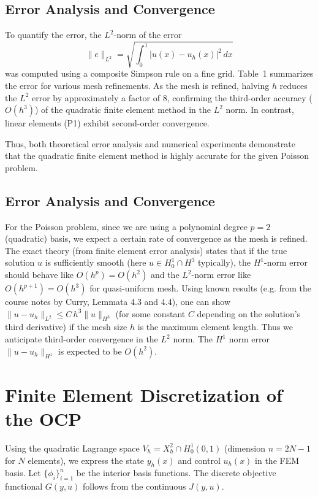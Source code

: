 \documentclass[a4paper,10pt]{article}
\begin{document}
\subsection{Error Analysis and Convergence}
To quantify the error, the \(L^2\)-norm of the error
\[
	\|e\|_{L^2} = \sqrt{\int_0^1 |u(x)-u_h(x)|^2\,dx}
\]
was computed using a composite Simpson rule on a fine grid. Table~1 summarizes the error for various mesh refinements. As the mesh is refined, halving \(h\) reduces the \(L^2\) error by approximately a factor of 8, confirming the third-order accuracy (\(O(h^3)\)) of the quadratic finite element method in the \(L^2\) norm. In contrast, linear elements (P1) exhibit second-order convergence.

Thus, both theoretical error analysis and numerical experiments demonstrate that the quadratic finite element method is highly accurate for the given Poisson problem.

\subsection{Error Analysis and Convergence}
For the Poisson problem, since we are using a polynomial degree \(p=2\) (quadratic) basis, we expect a certain rate of convergence as the mesh is refined.
The exact theory (from finite element error analysis) states that if the true solution \(u\) is sufficiently smooth (here \(u\in H^1_0\cap H^3\) typically), the \(H^1\)-norm error should behave like \(O(h^p) = O(h^2)\) and the \(L^2\)-norm error like \(O(h^{p+1}) = O(h^3)\) for quasi-uniform mesh.
Using known results (e.g. from the course notes by Curry, Lemmata 4.3 and 4.4), one can show \(\|u - u_h\|_{L^2} \le C\,h^3 \|u\|_{H^3}\) (for some constant \(C\) depending on the solution's third derivative) if the mesh size \(h\) is the maximum element length. Thus we anticipate third-order convergence in the \(L^2\) norm. The \(H^1\) norm error \(\|u-u_h\|_{H^1}\) is expected to be \(O(h^2)\).

\section{Finite Element Discretization of the OCP}
Using the quadratic Lagrange space \(V_h = X_h^2 \cap H^1_0(0,1)\) (dimension \(n=2N-1\) for \(N\) elements), we express the state \(y_h(x)\) and control \(u_h(x)\) in the FEM basis.
Let \(\{\phi_i\}_{i=1}^n\) be the interior basis functions. The discrete objective functional \(G(y,u)\) follows from the continuous \(J(y,u)\).
\end{document}
